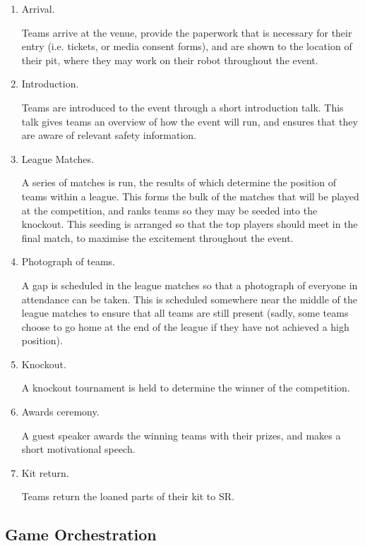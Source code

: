 \begin{enumerate}
\item Arrival.

  Teams arrive at the venue, provide the paperwork that is necessary for their entry (i.e. tickets, or media consent forms), and are shown to the location of their pit, where they may work on their robot throughout the event.

\item Introduction.

  Teams are introduced to the event through a short introduction talk.  This talk gives teams an overview of how the event will run, and ensures that they are aware of relevant safety information.

\item League Matches.

  A series of matches is run, the results of which determine the position of teams within a league.  This forms the bulk of the matches that will be played at the competition, and ranks teams so they may be seeded into the knockout.  This seeding is arranged so that the top players should meet in the final match, to maximise the excitement throughout the event.

\item Photograph of teams.

  A gap is scheduled in the league matches so that a photograph of everyone in attendance can be taken.  This is scheduled somewhere near the middle of the league matches to ensure that all teams are still present (sadly, some teams choose to go home at the end of the league if they have not achieved a high position).

\item Knockout.

  A knockout tournament is held to determine the winner of the competition.

\item Awards ceremony.

  A guest speaker awards the winning teams with their prizes, and makes a short motivational speech.

\item Kit return.

  Teams return the loaned parts of their kit to SR.
\end{enumerate}

\subsection{Game Orchestration}

